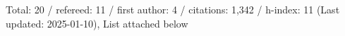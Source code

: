 Total: 20 / refereed: 11 / first author: 4 / citations: 1,342 / h-index: 11 (Last updated: 2025-01-10), List attached below